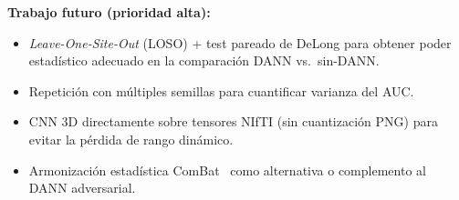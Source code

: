 \documentclass[conference]{IEEEtran}
\begin{document}
\textbf{Trabajo futuro (prioridad alta):}
\begin{itemize}
  \item \emph{Leave-One-Site-Out} (LOSO) + test pareado de DeLong
        para obtener poder estadístico adecuado en la comparación
        DANN vs.\ sin-DANN.
  \item Repetición con múltiples semillas para cuantificar varianza
        del AUC.
  \item CNN 3D directamente sobre tensores NIfTI (sin cuantización
        PNG) para evitar la pérdida de rango dinámico.
  \item Armonización estadística ComBat~\cite{johnson2007} como
        alternativa o complemento al DANN adversarial.
\end{itemize}



\end{document}
